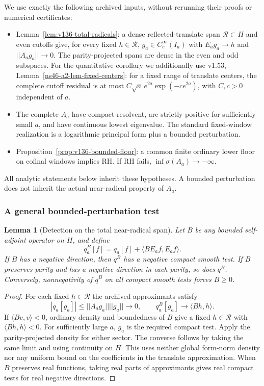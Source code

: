 \documentclass[11pt]{article}
\def\norm#1{||#1||}%
\newtheorem{lemma}[theorem]{Lemma}
\theoremstyle{remark}
\newcommand{\norm}[1]{\left\lVert #1\right\rVert}
\begin{document}
We use exactly the following archived inputs, without rerunning their proofs
or numerical certificates:
\begin{itemize}
\item Lemma~\ref{lem:v136-total-radicals}: a dense reflected-translate
span $\mathcal R\subset H$ and even cutoffs give, for every fixed
$h\in\mathcal R$, $g_a\in C_c^\infty(I_a)$ with
$E_ag_a\to h$ and $\norm{A_ag_a}\to0$.
The parity-projected spans are dense in the even and odd subspaces.
For the quantitative corollary we additionally use v1.53,
Lemma~\ref{ns46-a2-lem-fixed-centers}: for a fixed range of translate
centers, the complete cutoff residual is at most
$C\sqrt a\,e^{2a}\exp(-c e^{2a})$, with $C,c>0$ independent of $a$.
\item The complete $A_a$ have compact resolvent, are strictly positive
for sufficiently small $a$, and have continuous lowest eigenvalue.
The standard fixed-window realization is a logarithmic principal form
plus a bounded perturbation.
\item Proposition~\ref{prop:v136-bounded-floor}: a common finite
ordinary lower floor on cofinal windows implies RH. If RH fails,
$\inf\sigma(A_a)\to-\infty$.
\end{itemize}
All analytic statements below inherit these hypotheses. A bounded perturbation
does not inherit the actual near-radical property of $A_a$.

\subsubsection*{A general bounded-perturbation test}
\begin{lemma}[Detection on the total near-radical span]\label{lem:ns57-bounded-detection}
Let $B$ be any bounded self-adjoint operator on $H$, and define
\[
 q_a^B[f]=q_a[f]+\langle BE_af,E_af\rangle.
\]
If $B$ has a negative direction, then $q^B$ has a negative compact
smooth test. If $B$ preserves parity and has a negative direction
in each parity, so does $q^B$. Conversely, nonnegativity of $q^B$
on all compact smooth tests forces $B\ge0$.
\end{lemma}
\begin{proof}
For each fixed $h\in\mathcal R$ the archived approximants satisfy
\[
 |q_a[g_a]|\le\norm{A_ag_a}\norm{g_a}\longrightarrow0,
 \qquad q_a^B[g_a]\longrightarrow\langle Bh,h\rangle.
\]
If $\langle Bv,v\rangle<0$, ordinary density and boundedness of $B$
give a fixed $h\in\mathcal R$ with $\langle Bh,h\rangle<0$.
For sufficiently large $a$, $g_a$ is the required compact test.
Apply the parity-projected density for either sector. The converse
follows by taking the same limit and using continuity on $H$.
This uses neither global form-norm density nor any uniform bound
on the coefficients in the translate approximation.
When $B$ preserves real functions, taking real parts of approximants
gives real compact tests for real negative directions.
\end{proof}
\end{document}
